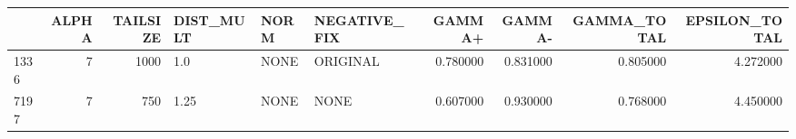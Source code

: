 \begin{tabular}{lrrlllrrrr}
\toprule
 & ALPHA & TAILSIZE & DIST_MULT & NORM & NEGATIVE_FIX & GAMMA+ & GAMMA- & GAMMA_TOTAL & EPSILON_TOTAL \\
\midrule
1336 & 7 & 1000 & 1.0 & NONE & ORIGINAL & 0.780000 & 0.831000 & 0.805000 & 4.272000 \\
7197 & 7 & 750 & 1.25 & NONE & NONE & 0.607000 & 0.930000 & 0.768000 & 4.450000 \\
\bottomrule
\end{tabular}
